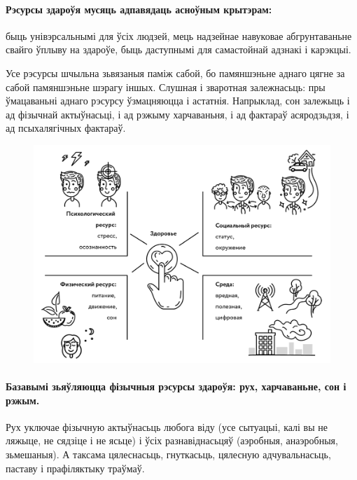 \paragraph{Рэсурсы здароўя мусяць адпавядаць асноўным крытэрам:} быць унівэрсальнымі для ўсіх людзей, мець надзейнае навуковае абгрунтаваньне свайго ўплыву на здароўе, быць даступнымі для самастойнай адзнакі і карэкцыі.

Усе рэсурсы шчыльна зьвязаныя паміж сабой, бо памяншэньне аднаго цягне за сабой памяншэньне шэрагу іншых. Слушная і зваротная залежнасьць: пры ўмацаваньні аднаго рэсурсу ўзмацняюцца і астатнія. Напрыклад, сон залежыць і ад фізычнай актыўнасьці, і ад рэжыму харчаваньня, і ад фактараў асяродзьдзя, і ад псыхалягічных фактараў.

\begin{figure}[htb!]
  \centering
  \includegraphics[width=1\textwidth]{willpower/pic5.png}
\end{figure}

\paragraph{Базавымі зьяўляюцца фізычныя рэсурсы здароўя: рух, харчаваньне, сон і рэжым.} Рух уключае фізычную актыўнасьць любога віду (усе сытуацыі, калі вы не ляжыце, не сядзіце і не ясьце) і ўсіх разнавіднасьцяў (аэробныя, анаэробныя, зьмешаныя). А таксама цялеснасьць, гнуткасьць, цялесную адчувальнасьць, паставу і прафіляктыку траўмаў.

